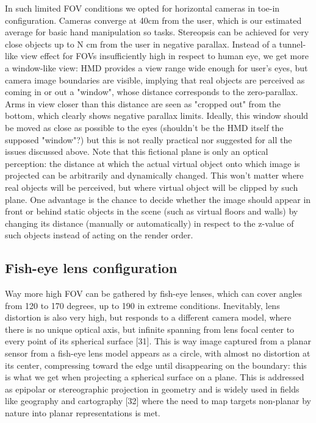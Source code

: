 In such limited FOV conditions we opted for horizontal cameras in toe-in configuration. Cameras converge at 40cm from the user, which is our estimated average for basic hand manipulation so tasks. Stereopsis can be achieved for very close objects up to N cm from the user in negative parallax. Instead of a tunnel-like view effect for FOVs insufficiently high in respect to human eye, we get more a window-like view: HMD provides a view range wide enough for user's eyes, but camera image boundaries are visible, implying that real objects are perceived as coming in or out a "window", whose distance corresponds to the zero-parallax. Arms in view closer than this distance are seen as "cropped out" from the bottom, which clearly shows negative parallax limits. Ideally, this window should be moved as close as possible to the eyes (shouldn't be the HMD itself the supposed "window"?) but this is not really practical nor suggested for all the issues discussed above. Note that this fictional plane is only an optical perception: the distance at which the actual virtual object onto which image is projected can be arbitrarily and dynamically changed. This won't matter where real objects will be perceived, but where virtual object will be clipped by such plane. One advantage is the chance to decide whether the image should appear in front or behind static objects in the scene (such as virtual floors and walls) by changing its distance (manually or automatically) in respect to the z-value of such objects instead of acting on the render order.

\subsection{Fish-eye lens configuration}
Way more high FOV can be gathered by fish-eye lenses, which can cover angles from 120 to 170 degrees, up to 190 in extreme conditions. Inevitably, lens distortion is also very high, but responds to a different camera model, where there is no unique optical axis, but infinite spanning from lens focal center to every point of its spherical surface [31]. This is way image captured from a planar sensor from a fish-eye lens model appears as a circle, with almost no distortion at its center, compressing toward the edge until disappearing on the boundary: this is what we get when projecting a spherical surface on a plane. This is addressed as epipolar or stereographic projection in geometry and is widely used in fields like geography and cartography [32] where the need to map targets non-planar by nature into planar representations is met.

